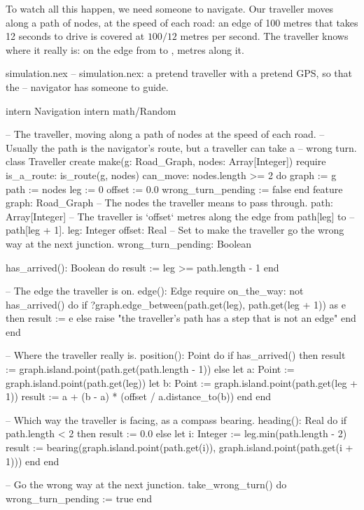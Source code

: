 To watch all this happen, we need someone to navigate. Our traveller
moves along a path of nodes, at the speed of each road: an edge of 100
metres that takes 12 seconds to drive is covered at $100/12$ metres per
second. The traveller knows where it really is: on the edge from
 to ,  metres along it.

\begin{newfile}{simulation.nex}
-- simulation.nex: a pretend traveller with a pretend GPS, so that the
-- navigator has someone to guide.

intern Navigation
intern math/Random

-- The traveller, moving along a path of nodes at the speed of each road.
-- Usually the path is the navigator's route, but a traveller can take a
-- wrong turn.
class Traveller
create
  make(g: Road_Graph, nodes: Array[Integer])
  require
    is_a_route: is_route(g, nodes)
    can_move: nodes.length >= 2
  do
    graph := g
    path := nodes
    leg := 0
    offset := 0.0
    wrong_turn_pending := false
  end
feature
  graph: Road_Graph
  -- The nodes the traveller means to pass through.
  path: Array[Integer]
  -- The traveller is `offset` metres along the edge from path[leg] to
  -- path[leg + 1].
  leg: Integer
  offset: Real
  -- Set to make the traveller go the wrong way at the next junction.
  wrong_turn_pending: Boolean

  has_arrived(): Boolean do
    result := leg >= path.length - 1
  end

  -- The edge the traveller is on.
  edge(): Edge
  require
    on_the_way: not has_arrived()
  do
    if ?graph.edge_between(path.get(leg), path.get(leg + 1)) as e then
      result := e
    else
      raise "the traveller's path has a step that is not an edge"
    end
  end

  -- Where the traveller really is.
  position(): Point do
    if has_arrived() then
      result := graph.island.point(path.get(path.length - 1))
    else
      let a: Point := graph.island.point(path.get(leg))
      let b: Point := graph.island.point(path.get(leg + 1))
      result := a + (b - a) * (offset / a.distance_to(b))
    end
  end

  -- Which way the traveller is facing, as a compass bearing.
  heading(): Real do
    if path.length < 2 then
      result := 0.0
    else
      let i: Integer := leg.min(path.length - 2)
      result := bearing(graph.island.point(path.get(i)), graph.island.point(path.get(i + 1)))
    end
  end

  -- Go the wrong way at the next junction.
  take_wrong_turn() do
    wrong_turn_pending := true
  end
\end{newfile}

